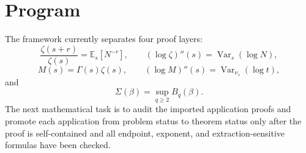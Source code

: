 \documentclass[11pt]{article}
\theoremstyle{definition}
\theoremstyle{remark}
\DeclareMathOperator{\Var}{Var}
\newcommand{\E}{\mathbb E}
\newcommand{\1}{\mathbf 1}
\begin{document}
\section{Program}

The framework currently separates four proof layers:
\[
\frac{\zeta(s+r)}{\zeta(s)}=\E_s[N^{-r}],
\qquad
(\log\zeta)''(s)=\Var_s(\log N),
\]
\[
M(s)=\Gamma(s)\zeta(s),
\qquad
(\log M)''(s)=\Var_{\nu_s}(\log t),
\]
and
\[
\Sigma(\beta)=\sup_{q\ge2}B_q(\beta).
\]
The next mathematical task is to audit the imported application proofs and promote each application from problem status to theorem status only after the proof is self-contained and all endpoint, exponent, and extraction-sensitive formulas have been checked.
\end{document}
